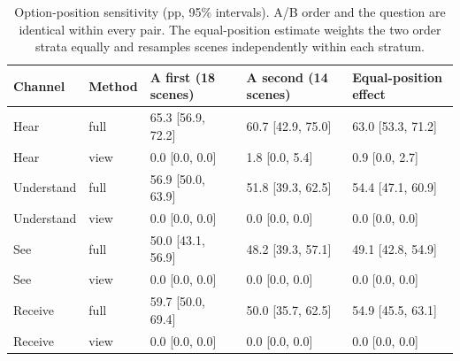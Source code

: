 \documentclass[11pt]{article}
\begin{document}
\begin{table}[!tp]
\centering\setlength{\tabcolsep}{4.5pt}\small
\begin{lrbox}{\OCtable}\begin{tabular*}{\linewidth}{@{\extracolsep{\fill}}lllll@{}}
\toprule
\textbf{Channel} & \textbf{Method} & \textbf{A first (18 scenes)} & \textbf{A second (14 scenes)} & \textbf{Equal-position effect}\\
\midrule
Hear & full & 65.3 [56.9, 72.2] & 60.7 [42.9, 75.0] & 63.0 [53.3, 71.2]\\
Hear & view & 0.0 [0.0, 0.0] & 1.8 [0.0, 5.4] & 0.9 [0.0, 2.7]\\
Understand & full & 56.9 [50.0, 63.9] & 51.8 [39.3, 62.5] & 54.4 [47.1, 60.9]\\
Understand & view & 0.0 [0.0, 0.0] & 0.0 [0.0, 0.0] & 0.0 [0.0, 0.0]\\
See & full & 50.0 [43.1, 56.9] & 48.2 [39.3, 57.1] & 49.1 [42.8, 54.9]\\
See & view & 0.0 [0.0, 0.0] & 0.0 [0.0, 0.0] & 0.0 [0.0, 0.0]\\
Receive & full & 59.7 [50.0, 69.4] & 50.0 [35.7, 62.5] & 54.9 [45.5, 63.1]\\
Receive & view & 0.0 [0.0, 0.0] & 0.0 [0.0, 0.0] & 0.0 [0.0, 0.0]\\
\bottomrule
\end{tabular*}\end{lrbox}
\ifdim\wd\OCtable>\linewidth\PackageError{access-paper}{Table tab:choiceorder exceeds its column}{Revise the table layout.}\fi
\usebox{\OCtable}
\caption{Option-position sensitivity (pp, 95\% intervals). A/B order and the question are identical within every pair. The equal-position estimate weights the two order strata equally and resamples scenes independently within each stratum.}
\label{tab:choiceorder}
\end{table}
\end{document}
